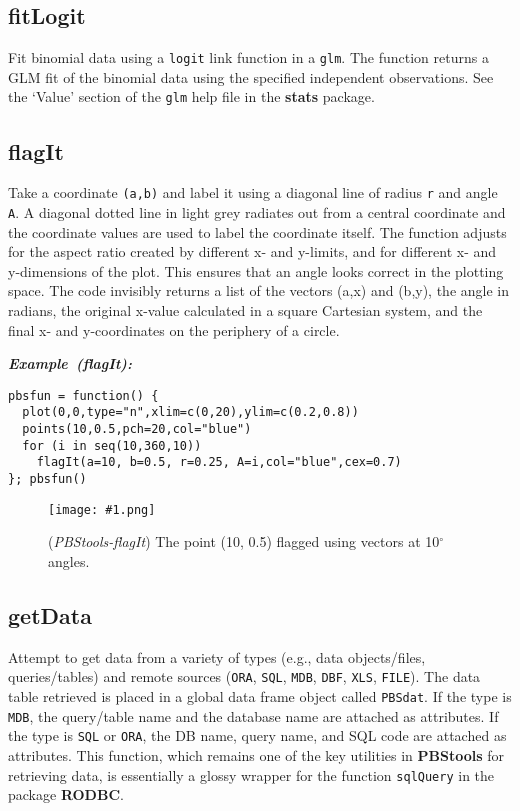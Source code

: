\documentclass[letterpaper,12pt,fleqn]{article}
\def\tab{\hspace{0.5 in}}
\newcommand{\code}[1]{\small\texttt{#1}\normalsize}
\newcommand{\pkg}[1]{{\bf #1}}
\newcommand{\sQuote}[1]{`#1'}
\newcommand\pbsfig[4]{    %
	\begin{figure}[ht!] %
	\centering
	\texttt{[image: \#1.png]}
	\ifthenelse{\isempty{#4}}
		{\caption[#2]{(\emph{#1}) #2}\vspace{-2ex}}
		{\caption[#4]{(\emph{#1}) #2}\vspace{-2ex}}
	\label{fig:#1}
	\end{figure}
}
\newcommand\example[1]{    %
	\textbf{\emph{Example~(#1):}}\\ \vspace{3 pt}
}
\begin{document}
\subsection {fitLogit}

\tab Fit binomial data using a \code{logit} link function in a \code{glm}. The function returns a GLM fit of the binomial data using the specified independent observations. See the \sQuote{Value} section of the \code{glm} help file in the \pkg{stats} package.

\subsection {flagIt}

\tab Take a coordinate \code{(a,b)} and label it using a diagonal line of radius \code{r} and angle \code{A}.
A diagonal dotted line in light grey radiates out from a central coordinate and the coordinate values are used to label the coordinate itself.
The function adjusts for the aspect ratio created by different x- and y-limits, and for different x- and y-dimensions of the plot. 
This ensures that an angle looks correct in the plotting space.
The code invisibly returns a list of the vectors (a,x) and (b,y), the angle in radians, the original x-value calculated in a square Cartesian system, and the final x- and y-coordinates on the periphery of a circle.

\begin{examplebox}
\example{flagIt}
\begin{Verbatim}[fontsize=\footnotesize]
pbsfun = function() {
  plot(0,0,type="n",xlim=c(0,20),ylim=c(0.2,0.8))
  points(10,0.5,pch=20,col="blue")
  for (i in seq(10,360,10))
    flagIt(a=10, b=0.5, r=0.25, A=i,col="blue",cex=0.7)
}; pbsfun()
\end{Verbatim}
\end{examplebox}
\pbsfig{PBStools-flagIt}{The point (10, 0.5) flagged using vectors at 10$^{\circ}$ angles.}{3.0}{}

\subsection {getData}

\tab Attempt to get data from a variety of types (e.g., data objects/files, queries/tables) and remote sources (\code{ORA}, \code{SQL}, \code{MDB}, \code{DBF}, \code{XLS}, \code{FILE}). The data table retrieved is placed in a global data frame object called \code{PBSdat}. If the type is \code{MDB}, the query/table name and the database name are attached as attributes. If the type is \code{SQL} or \code{ORA}, the DB name, query name, and SQL code are attached as attributes. This function, which remains one of the key utilities in \pkg{PBStools} for retrieving data, is essentially a glossy wrapper for the function \code{sqlQuery} in the package \pkg{RODBC}.
\end{document}
